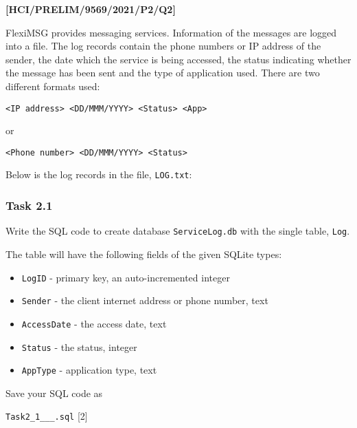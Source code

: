 \item \textbf{{[}HCI/PRELIM/9569/2021/P2/Q2{]}}

FlexiMSG provides messaging services. Information of the messages
are logged into a file. The log records contain the phone numbers
or IP address of the sender, the date which the service is being accessed,
the status indicating whether the message has been sent and the type
of application used. There are two different formats used: 

\texttt{<IP address> <DD/MMM/YYYY> <Status> <App> }

or 

\texttt{<Phone number> <DD/MMM/YYYY> <Status>}

Below is the log records in the file, \texttt{LOG.txt}: 

\noindent %
\noindent{}

\subsubsection*{Task 2.1 }

Write the SQL code to create database \texttt{ServiceLog.db} with
the single table, \texttt{Log}. 

The table will have the following fields of the given SQLite types: 
\begin{itemize}
\item \texttt{LogID} - primary key, an auto-incremented integer 
\item \texttt{Sender} - the client internet address or phone number, text 
\item \texttt{AccessDate} - the access date, text 
\item \texttt{Status} - the status, integer 
\item \texttt{AppType} - application type, text 
\end{itemize}
Save your SQL code as 

\texttt{Task2\_1\_<your name>\_<center number>\_<index number>.sql}
\hfill{}{[}2{]}

